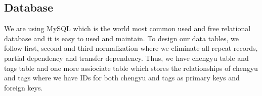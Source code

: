 \documentclass[11pt]{article} %
\begin{document}
\subsection{Database}
\indent We are using MySQL which is the world most common used and free relational database and it is easy to used and maintain. To design our data tables, we follow first, second and third normalization where we eliminate all repeat records, partial dependency and transfer dependency. Thus, we have chengyu table and tags table and one more assiociate table which stores the relationships of chengyu and tags where we have IDs for both chengyu and tags as primary keys and foreign keys.



\end{document}
